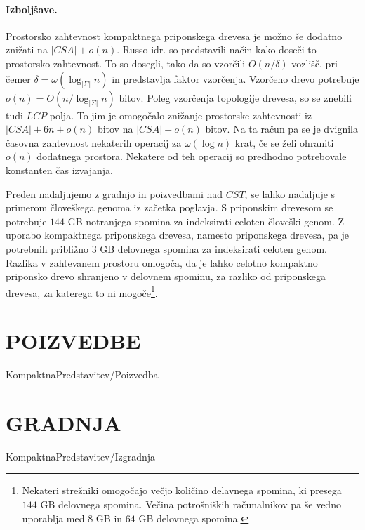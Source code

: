 \paragraph{Izboljšave.}
Prostorsko zahtevnost kompaktnega priponskega drevesa je možno še dodatno znižati na $|CSA|+o(n)$. Russo idr. \cite{Russo2008} so predstavili način kako doseči to prostorsko zahtevnost. To so dosegli, tako da so vzorčili $O(n/\delta)$ vozlišč, pri čemer $\delta=\omega(\log_{|\Sigma|}{n})$ in predstavlja faktor vzorčenja. Vzorčeno drevo potrebuje $o(n)=O(n/\log_{|\Sigma|}{n})$ bitov. Poleg vzorčenja topologije drevesa, so se znebili tudi $LCP$ polja. To jim je omogočalo znižanje prostorske zahtevnosti iz $|CSA|+6n+o(n)$ bitov na $|CSA|+o(n)$ bitov. Na ta račun pa se je dvignila časovna zahtevnost nekaterih operacij za $\omega(\log{n})$ krat, če se želi ohraniti $o(n)$ dodatnega prostora. Nekatere od teh operacij so predhodno potrebovale konstanten čas izvajanja.

Preden nadaljujemo z gradnjo in poizvedbami nad $CST$, se lahko nadaljuje s primerom človeškega genoma iz začetka poglavja. S priponskim drevesom se potrebuje $144$ GB notranjega spomina za indeksirati celoten človeški genom. Z uporabo kompaktnega priponskega drevesa, namesto priponskega drevesa, pa je potrebnih približno $3$ GB delovnega spomina za indeksirati celoten genom. Razlika v zahtevanem prostoru omogoča, da je lahko celotno kompaktno priponsko drevo shranjeno v delovnem spominu, za razliko od priponskega drevesa, za katerega to ni mogoče\footnote{Nekateri strežniki omogočajo večjo količino delavnega spomina, ki presega $144$ GB delovnega spomina. Večina potrošniških računalnikov pa še vedno uporablja med $8$ GB in $64$ GB delovnega spomina.}.

\section{POIZVEDBE}\label{sec:CSTpoizvedba}
{KompaktnaPredstavitev/Poizvedba}

\section{GRADNJA}\label{sec:CSTizgradnja}
{KompaktnaPredstavitev/Izgradnja}




